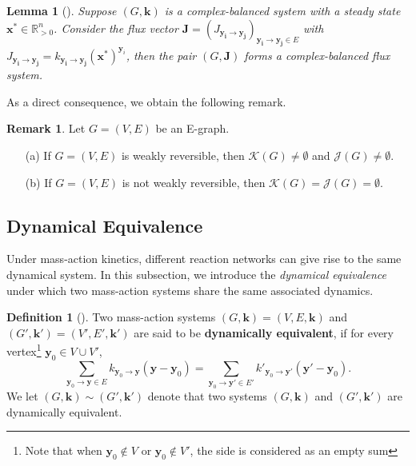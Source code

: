 \documentclass[11pt]{article}
\theoremstyle{plain}
\newtheorem{lemma}[theorem]{Lemma}
\theoremstyle{definition}
\newtheorem{definition}[theorem]{Definition}
\newtheorem{remark}[theorem]{Remark}
\theoremstyle{remark}
\newcommand\RR{\mathbb{R}}
\newcommand\by{\boldsymbol{y}}
\newcommand\byi{\boldsymbol{y_i}}
\newcommand\byj{\boldsymbol{y_j}}
\newcommand\bk{\boldsymbol{k}}
\newcommand\bx{\boldsymbol{x}}
\newcommand\bJ{\boldsymbol{J}}
\newcommand{\mK}{\mathcal{K}}
\newcommand{\defi}{\textbf}
\begin{document}
\begin{lemma}[\cite{craciun2020efficient}]
Suppose $(G, \bk)$ is a complex-balanced system with a steady state $\bx^* \in \RR^n_{>0}$. Consider the flux vector $\bJ = (J_{\byi \to \byj})_{\byi \to \byj \in E}$ with $J_{\byi \to \byj} = k_{\byi \to \byj} (\bx^*)^{\by_i}$, then the pair $(G, \bJ)$ forms a complex-balanced flux system.
\end{lemma}

As a direct consequence, we obtain the following remark.

\begin{remark}
\label{rmk:graph_KJ}
Let $G=(V, E)$ be an E-graph.
\begin{enumerate}
\item[(a)] If $G=(V,E)$ is weakly reversible, then $\mK (G) \neq \emptyset$ and $\mathcal{J}(G) \neq \emptyset$.

\item[(b)] If $G=(V,E)$ is not weakly reversible, then $\mK (G) = \mathcal{J}(G) = \emptyset$.
\end{enumerate}
\end{remark}

\subsection{Dynamical Equivalence}
\label{sec:dynamical_equivalence}

Under mass-action kinetics, different reaction networks can give rise to the same dynamical system. In this subsection, we introduce the \emph{dynamical equivalence} under which two mass-action systems share the same associated dynamics.

\begin{definition}[\cite{horn1972general,craciun2008identifiability}]
\label{def:de}
Two mass-action systems $(G, \bk) = (V, E, \bk)$ and $(G', \bk') = (V', E', \bk')$ are said to be \defi{dynamically equivalent}, if for every vertex\footnote{\label{footnote1} Note that when $\by_0 \not\in V$ or $\by_0 \not\in V'$, the side is considered as an empty sum} $\by_0 \in V \cup V'$,
\begin{equation}
\label{eq:DE}
\sum_{\by_0 \to \by \in E} k_{\by_0  \to \by} (\by - \by_0) 
= \sum_{\by_0 \to \by' \in E'} k'_{\by_0  \to \by'}  (\by' - \by_0).
\end{equation}
We let $(G, \bk) \sim (G', \bk')$ denote that 
two systems $(G, \bk)$ and $(G', \bk')$ are dynamically equivalent.
\end{definition} 
\end{document}
